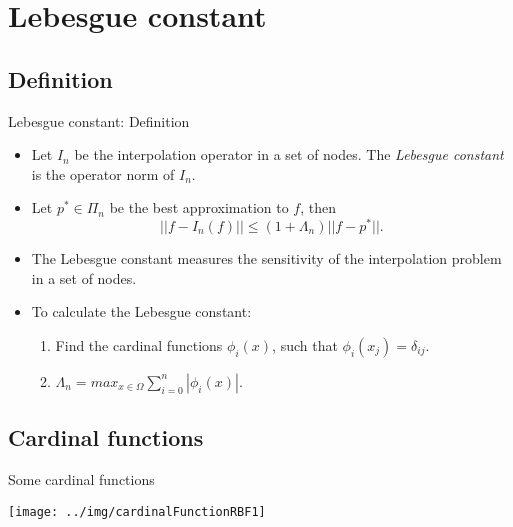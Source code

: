 \documentclass{beamer}
\begin{document}
\section{Lebesgue constant}
\subsection{Definition}
\begin{frame}{Lebesgue constant: Definition}
  \begin{itemize}
    \item Let $I_n$ be the interpolation operator in a set of nodes. The 
      \emph{Lebesgue constant} is the operator norm of $I_n$.

    \item Let $p^* \in \Pi_n$ be the best approximation to $f$, then
      \begin{equation*}
	||f - I_n(f)|| \le (1 + \Lambda_n) ||f - p^*||.
      \end{equation*}

    \item The Lebesgue constant measures the sensitivity of the interpolation
      problem in a set of nodes.

    \item To calculate the Lebesgue constant:
      \begin{enumerate}
        \item Find the cardinal functions $\phi_i(x)$, such that $\phi_i(x_j) = 
	  \delta_{ij}$.
	\item $\Lambda_n = max_{x \in \Omega}\sum_{i=0}^n |\phi_i(x)|$.
      \end{enumerate}
  \end{itemize}
\end{frame}

\subsection{Cardinal functions}
\begin{frame}{Some cardinal functions}
  \begin{center}
    \texttt{[image: ../img/cardinalFunctionRBF1]}
  \end{center}
\end{frame}
\end{document}
